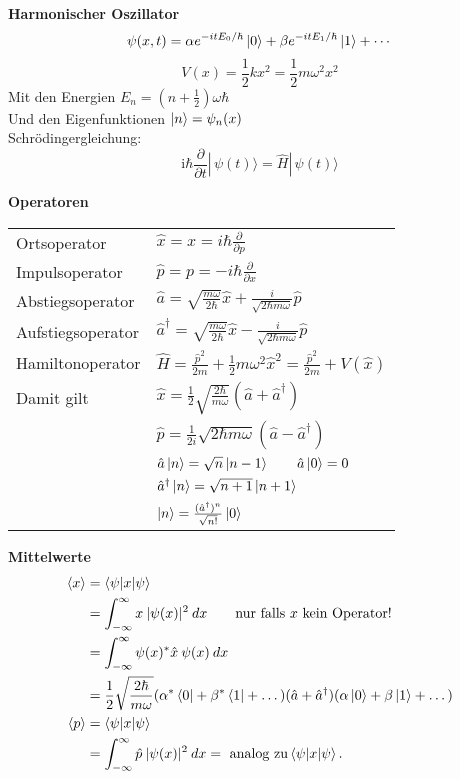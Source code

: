 \documentclass[landscape,8pt]{scrartcl}
\newcommand{\myheading}[1]{\textbf{#1}}
\begin{document}
\begin{multicols}{3}

\myheading{Harmonischer Oszillator}
\[
	\psi(x,t)
		= \alpha e^{-itE_0/\hbar}\ket 0 
		+ \beta  e^{-itE_1/\hbar}\ket 1  
		+ \cdots
\]
\[V(x)=\frac 1 2 k x^2 = \frac 1 2 m \omega^2 x^2\]
Mit den Energien $E_n = \left(n+\frac 12\right) \omega \hbar $ \\
Und den Eigenfunktionen $\ket n = \psi_n(x)$\\
Schrödingergleichung:
\[\mathrm{i}\hbar\frac{\partial}{\partial t} |\,\psi (t) \rangle = \hat{H} |\,\psi (t) \rangle\]


\myheading{Operatoren}
\begin{tabular}{ll}
Ortsoperator 			& $\hat x = x = i \hbar \frac{\partial}{\partial p}$	\\
Impulsoperator 			& $\hat p = p = -i\hbar \frac{\partial}{\partial x}$	\\
Abstiegsoperator 		& $\hat a = \sqrt{\frac{m \omega}{2\hbar}} \hat x + \frac{i}{\sqrt{2\hbar m \omega}} \hat p$	\\
Aufstiegsoperator 		& $\hat a^\dagger = \sqrt{\frac{m \omega}{2\hbar}} \hat x - \frac{i}{\sqrt{2\hbar m \omega}} \hat p$ \\
Hamiltonoperator		& $\hat H=\frac{\hat p^2}{2m}+\frac{1}{2}m\omega^2\hat x^2 = \frac{\hat p^2}{2m} + V(\hat x)$	\\
Damit gilt				& $\hat x  = \frac 12 \sqrt{\frac{2\hbar}{m\omega}}(\hat a + \hat a^\dagger) $ \\
						& $\hat p  = \frac 1{2i} \sqrt {2\hbar m \omega} (\hat a - \hat a^\dagger) $\\
						& $\hat a\ket n = \sqrt{n}\ket{n-1} \qquad \hat a \ket 0 = 0$ \\
						& $\hat a^\dagger \ket n = \sqrt{n+1}\ket {n+1}$	\\
						& $\ket n = \frac{(\hat a^\dagger)^n}{\sqrt {n!}} \ket 0 $
\end{tabular}

\myheading{Mittelwerte}
\begin{align*}
\braket{x} 	&=\braket{\psi|x|\psi}\\
			&=\int_{-\infty}^{\infty} x\:|\psi(x)|^2\:dx\qquad\text{nur falls } x \text{ kein Operator!}\\
			&=\int_{-\infty}^{\infty} \psi(x)^\ast \hat x\:\psi(x)\:dx		\\
			&=\frac 12 \sqrt{\frac{2\hbar}{m\omega}}(\alpha^\ast \bra 0 + \beta^\ast \bra 1 + \dots) (\hat a + \hat a^\dagger) (\alpha \ket 0 + \beta \ket 1 + \dots) \\
\braket{p}	&=\braket{\psi|x|\psi}	\\
			&=\int_{-\infty}^{\infty} \hat p\:|\psi(x)|^2\:dx= \text{ analog zu}\braket{\psi|x|\psi}\text{.}	\\
\end{align*}



\end{multicols}
\end{document}
